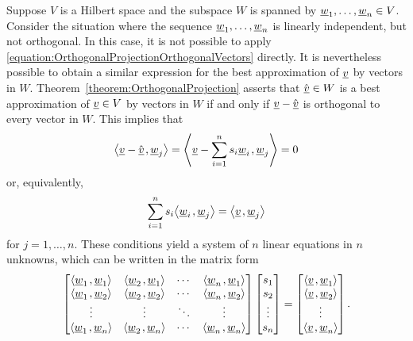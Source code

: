 Suppose $V$ is a Hilbert space and the subspace $W$ is spanned by $\underline{w}_1, \ldots, \underline{w}_n \in V$.
Consider the situation where the sequence $\underline{w}_1, \ldots, \underline{w}_n$ is linearly independent, but not orthogonal.
In this case, it is not possible to apply \eqref{equation:OrthogonalProjectionOrthogonalVectors} directly.
It is nevertheless possible to obtain a similar expression for the best approximation of $\underline{v}$ by vectors in $W$.
Theorem~\ref{theorem:OrthogonalProjection} asserts that $\hat{\underline{v}} \in W$ is a best approximation of $\underline{v} \in V$ by vectors in $W$ if and only if $\underline{v} - \hat{\underline{v}}$ is orthogonal to every vector in $W$.
This implies that
\begin{equation*}
{\left\langle  \underline{v} - \hat{\underline{v}}  \mskip2mu ,  \underline{w}_j  \right\rangle}
= {\left\langle  \underline{v} - \sum_{i=1}^n s_i \underline{w}_i  \mskip2mu ,  \underline{w}_j  \right\rangle}
= 0
\end{equation*}
or, equivalently,
\begin{equation*}
\sum_{i=1}^n s_i {\left\langle  \underline{w}_i  \mskip2mu ,  \underline{w}_j  \right\rangle}
= {\left\langle  \underline{v}  \mskip2mu ,  \underline{w}_j  \right\rangle}
\end{equation*}
for $j = 1, \ldots, n$.
These conditions yield a system of $n$ linear equations in $n$ unknowns, which can be written in the matrix form
\begin{equation*}
\begin{bmatrix}
{\left\langle  \underline{w}_1  \mskip2mu ,  \underline{w}_1  \right\rangle}
& {\left\langle  \underline{w}_2  \mskip2mu ,  \underline{w}_1  \right\rangle} & \cdots
& {\left\langle  \underline{w}_n  \mskip2mu ,  \underline{w}_1  \right\rangle} \\
{\left\langle  \underline{w}_1  \mskip2mu ,  \underline{w}_2  \right\rangle}
& {\left\langle  \underline{w}_2  \mskip2mu ,  \underline{w}_2  \right\rangle} & \cdots
& {\left\langle  \underline{w}_n  \mskip2mu ,  \underline{w}_2  \right\rangle} \\
\vdots & \vdots & \ddots & \vdots \\
{\left\langle  \underline{w}_1  \mskip2mu ,  \underline{w}_n  \right\rangle}
& {\left\langle  \underline{w}_2  \mskip2mu ,  \underline{w}_n  \right\rangle} & \cdots
& {\left\langle  \underline{w}_n  \mskip2mu ,  \underline{w}_n  \right\rangle}
\end{bmatrix}
\begin{bmatrix} s_1 \\ s_2 \\ \vdots \\ s_n \end{bmatrix}
= \begin{bmatrix} {\left\langle  \underline{v}  \mskip2mu ,  \underline{w}_1  \right\rangle} \\
{\left\langle  \underline{v}  \mskip2mu ,  \underline{w}_2  \right\rangle} \\ \vdots \\
{\left\langle  \underline{v}  \mskip2mu ,  \underline{w}_n  \right\rangle} \end{bmatrix} .
\end{equation*}
